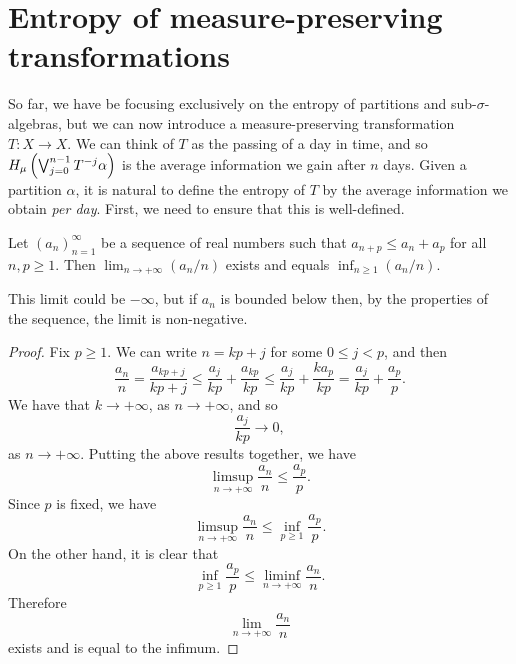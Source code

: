 \section{\texorpdfstring{\sloppy Entropy of measure-preserving transformations}{Entropy of measure-preserving transformations}}
So far, we have be focusing exclusively on the entropy of partitions and sub-$\sigma$-algebras, but we can now introduce a measure-preserving transformation $T : X \to X$. We can think of $T$ as the passing of a day in time, and so $H_\mu\left(\bigvee_{j = 0}^{n - 1}{T^{-j}{\alpha}}\right)$ is the average information we gain after $n$ days. Given a partition $\alpha$, it is natural to define the entropy of $T$ by the average information we obtain \emph{per day}. First, we need to ensure that this is well-defined.

\begin{theorem} \label{thm:walters-4-9}
	Let $(a_n)_{n = 1}^\infty$ be a sequence of real numbers such that $a_{n + p} \leq a_n + a_p$ for all $n, p \geq 1$. Then $\lim_{n \to +\infty}(a_n / n)$ exists and equals $\inf_{n \geq 1}(a_n / n)$.
	
	This limit could be $-\infty$, but if $a_n$ is bounded below then, by the properties of the sequence, the limit is non-negative.
	\begin{proof}
		Fix $p \geq 1$. We can write $n = kp + j$ for some $0 \leq j < p$, and then
		\[
			\frac{a_n}{n} = \frac{a_{kp + j}}{kp + j} \leq \frac{a_j}{kp} + \frac{a_{kp}}{kp} \leq \frac{a_j}{kp} + \frac{ka_p}{kp} = \frac{a_j}{kp} + \frac{a_p}{p}.
		\]
		We have that $k \to +\infty$, as $n \to +\infty$, and so
		\[
			\frac{a_j}{kp} \to 0,
		\]
		as $n \to +\infty$. Putting the above results together, we have
		\[
			\limsup_{n \to +\infty}{\frac{a_n}{n}} \leq \frac{a_p}{p}.
		\]
		Since $p$ is fixed, we have
		\[
			\limsup_{n \to +\infty}{\frac{a_n}{n}} \leq \inf_{p \geq 1}{\frac{a_p}{p}}.
		\]
		On the other hand, it is clear that
		\[
			\inf_{p \geq 1}{\frac{a_p}{p}} \leq \liminf_{n \to +\infty}{\frac{a_n}{n}}.
		\]
		Therefore
		\[
			\lim_{n \to +\infty}{\frac{a_n}{n}}
		\]
		exists and is equal to the infimum.
	\end{proof}
\end{theorem}

